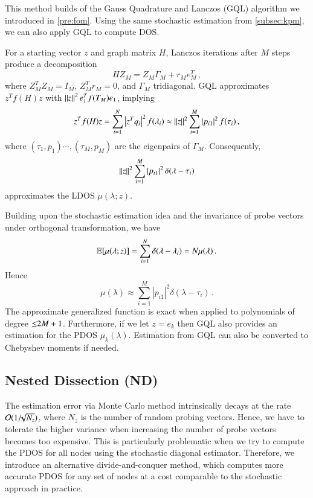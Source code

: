 This method builds of the Gauss Quadrature and Lanczos (GQL) algorithm we
introduced in \cref{pre:fom}. Using the same stochastic estimation from 
\cref{subsec:kpm}, we can also apply GQL to compute DOS.


For a starting vector $z$ and graph matrix $H$, Lanczos iterations after
$M$ steps produce a decomposition
\begin{equation*}
	HZ_M = Z_M\Gamma_M + r_Me_M^T\,,
\end{equation*}
where $Z_M^TZ_M = I_M$, $Z_M^Tr_M = 0$, and $\Gamma_M$ tridiagonal. GQL
approximates $z^Tf(H)z$ with $\left\lVert z\right\rVert^2e_1^Tf(T_M)e_1$, implying
\begin{equation}
	z^Tf(H)z = \sum_{i=1}^N \left\lvert z^Tq_i\right\rvert^2f(\lambda_i) \approx \left\lVert z\right\rVert^2\sum_
	{i=1}^M\left\lvert p_{i1}\right\rvert^2f(\tau_i)\,,
\end{equation}
where $(\tau_1,p_1)\cdots,(\tau_M, p_M)$ are the eigenpairs of $\Gamma_M$. 
Consequently,
\begin{equation}
	\left\lVert z\right\rVert^2\sum_{i=1}^M \left\lvert p_{i1}\right\rvert^2\delta(\lambda-\tau_i)
\end{equation}
approximates the LDOS $\mu(\lambda; z)$.

Building upon the stochastic estimation idea and the invariance of probe 
vectors under orthogonal transformation, we have
\begin{equation}
	\operatorname{\mathbb{E}}[\mu(\lambda;z)] = \sum_{i=1}^N \delta(\lambda-\lambda_i) = N\mu
	(\lambda)\,.
\end{equation}
Hence 
\begin{equation}
	\mu(\lambda)\approx\sum_{i=1}^M |p_{i1}|^2\delta(\lambda-\tau_i)\,.
\end{equation}
The approximate generalized function is exact when applied to polynomials of
degree $\mathbin{\leq} 2M+1$. Furthermore, if we let $z = e_k$ then GQL also provides an
estimation for the PDOS $\mu_k(\lambda)$. Estimation from GQL can also be
converted to Chebyshev moments if needed.

\subsection{Nested Dissection (ND)}

The estimation error via Monte Carlo method intrinsically decays at the rate
$\mathcal{O}(1 /\!\!\sqrt{N_z})$, where $N_z$ is the number of random probing vectors.
Hence, we have to tolerate the higher variance when increasing the number of
probe vectors becomes too expensive. This is particularly problematic when we
try to compute the PDOS for all nodes using the stochastic diagonal estimator.
Therefore, we introduce an alternative divide-and-conquer  method, which
computes more accurate PDOS for any set of nodes at a cost comparable to the
stochastic approach in practice.

